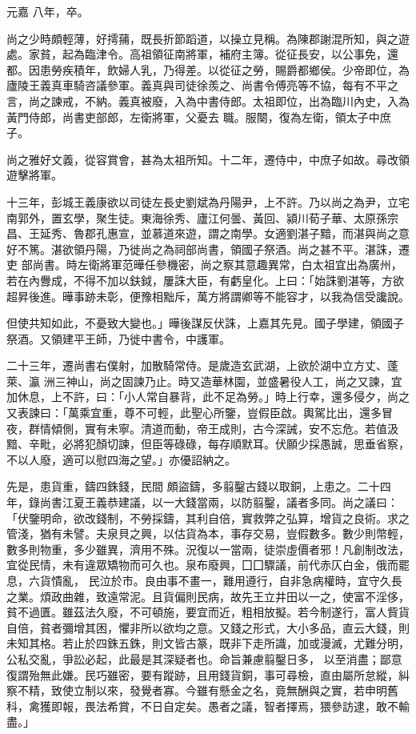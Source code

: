 \begin{pinyinscope}
 元嘉
 八年，卒。



 尚之少時頗輕薄，好摴蒱，既長折節蹈道，以操立見稱。為陳郡謝混所知，與之遊處。家貧，起為臨津令。高祖領征南將軍，補府主簿。從征長安，以公事免，還都。因患勞疾積年，飲婦人乳，乃得差。以從征之勞，賜爵都鄉侯。少帝即位，為廬陵王義真車騎咨議參軍。義真與司徒徐羨之、尚書令傅亮等不協，每有不平之言，尚之諫戒，不納。義真被廢，入為中書侍郎。太祖即位，出為臨川內史，入為黃門侍郎，尚書吏部郎，左衛將軍，父憂去
 職。服闋，復為左衛，領太子中庶子。



 尚之雅好文義，從容賞會，甚為太祖所知。十二年，遷侍中，中庶子如故。尋改領遊擊將軍。



 十三年，彭城王義康欲以司徒左長史劉斌為丹陽尹，上不許。乃以尚之為尹，立宅南郭外，置玄學，聚生徒。東海徐秀、廬江何曇、黃回、潁川荀子華、太原孫宗昌、王延秀、魯郡孔惠宣，並慕道來遊，謂之南學。女適劉湛子黯，而湛與尚之意好不篤。湛欲領丹陽，乃徙尚之為祠部尚書，領國子祭酒。尚之甚不平。湛誅，遷吏
 部尚書。時左衛將軍范曄任參機密，尚之察其意趣異常，白太祖宜出為廣州，若在內釁成，不得不加以鈇鉞，屢誅大臣，有虧皇化。上曰：「始誅劉湛等，方欲超昇後進。曄事跡未彰，便豫相黜斥，萬方將謂卿等不能容才，以我為信受讒說。



 但使共知如此，不憂致大變也。」曄後謀反伏誅，上嘉其先見。國子學建，領國子祭酒。又領建平王師，乃徙中書令，中護軍。



 二十三年，遷尚書右僕射，加散騎常侍。是歲造玄武湖，上欲於湖中立方丈、蓬萊、瀛
 洲三神山，尚之固諫乃止。時又造華林園，並盛暑役人工，尚之又諫，宜加休息，上不許，曰：「小人常自暴背，此不足為勞。」時上行幸，還多侵夕，尚之又表諫曰：「萬乘宜重，尊不可輕，此聖心所鑒，豈假臣啟。輿駕比出，還多冒夜，群情傾側，實有未寧。清道而動，帝王成則，古今深誡，安不忘危。若值汲黯、辛毗，必將犯顏切諫，但臣等碌碌，每存順默耳。伏願少採愚誠，思垂省察，不以人廢，適可以慰四海之望。」亦優詔納之。



 先是，患貨重，鑄四銖錢，民間
 頗盜鑄，多翦鑿古錢以取銅，上患之。二十四年，錄尚書江夏王義恭建議，以一大錢當兩，以防翦鑿，議者多同。尚之議曰：「伏鑒明命，欲改錢制，不勞採鑄，其利自倍，實救弊之弘算，增貨之良術。求之管淺，猶有未譬。夫泉貝之興，以估貨為本，事存交易，豈假數多。數少則幣輕，數多則物重，多少雖異，濟用不殊。況復以一當兩，徒崇虛價者邪！凡創制改法，宜從民情，未有違眾矯物而可久也。泉布廢興，囗囗驟議，前代赤仄白金，俄而罷息，六貨憒亂，
 民泣於市。良由事不畫一，難用遵行，自非急病權時，宜守久長之業。煩政曲雜，致遠常泥。且貨偏則民病，故先王立井田以一之，使富不淫侈，貧不過匱。雖茲法久廢，不可頓施，要宜而近，粗相放擬。若今制遂行，富人貲貨自倍，貧者彌增其困，懼非所以欲均之意。又錢之形式，大小多品，直云大錢，則未知其格。若止於四銖五銖，則文皆古篆，既非下走所識，加或漫滅，尤難分明，公私交亂，爭訟必起，此最是其深疑者也。命旨兼慮翦鑿日多，
 以至消盡；鄙意復謂殆無此嫌。民巧雖密，要有蹤跡，且用錢貨銅，事可尋檢，直由屬所怠縱，糾察不精，致使立制以來，發覺者寡。今雖有懸金之名，竟無酬與之實，若申明舊科，禽獲即報，畏法希賞，不日自定矣。愚者之議，智者擇焉，猥參訪逮，敢不輸盡。」




\end{pinyinscope}
